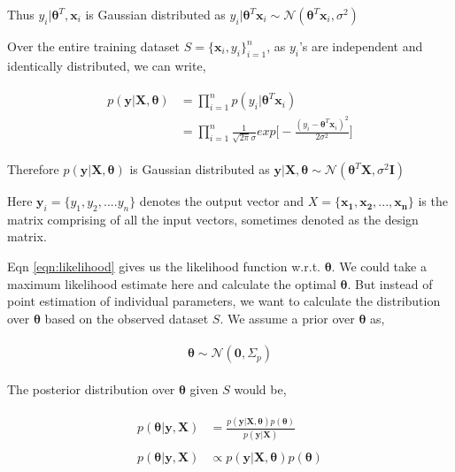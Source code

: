 \documentclass[english]{tktltiki}
\begin{document}
Thus $y_i|\boldsymbol\theta ^T, \mathbf{x}_i$ is Gaussian distributed as $y_i | \boldsymbol\theta ^T \mathbf{x}_i \sim \mathcal{N}(\boldsymbol\theta^T \mathbf{x}_i, \sigma^2)
$

Over the entire training dataset $S = \{\mathbf{x}_i, y_i\}_{i=1}^n$, as $y_i$'s are independent and identically distributed, we can write,

\begin{eqnarray}
\label{eqn:likelihood}
\begin{split}
	p(\mathbf{y} | \mathbf{X}, \boldsymbol\theta) &= \prod_{i = 1}^n p(y_i | \boldsymbol\theta ^T \mathbf{x}_i) \\
	&= \prod_{i = 1}^n \frac{1}{\sqrt{2 \pi} \sigma} exp \Big[-\frac{(y_i - \boldsymbol\theta ^T \mathbf{x}_i)^2}{2 \sigma^2} \Big]
\end{split}
\end{eqnarray}

Therefore $p(\mathbf{y} | \mathbf{X}, \boldsymbol\theta)$ is Gaussian distributed as $\mathbf{y} | \mathbf{X}, \boldsymbol\theta \sim \mathcal{N}(\boldsymbol\theta^T \mathbf{X}, \sigma^2 \mathbf{I})$

Here $\mathbf{y}_i = \{y_1, y_2, .... y_n\}$ denotes the output vector and $X = \{\mathbf{x_1}, \mathbf{x_2}, ..., \mathbf{x_n}\}$ is the matrix comprising of all the input vectors, sometimes denoted as the design matrix.



Eqn \ref{eqn:likelihood} gives us the likelihood function w.r.t. $\boldsymbol \theta$. We could take a maximum likelihood estimate here and calculate the optimal $\boldsymbol \theta$. But instead of point estimation of individual parameters, we want to calculate the distribution over $\boldsymbol \theta$ based on the observed dataset $S$. We assume a prior over $\boldsymbol \theta$ as,

\begin{eqnarray}
\label{eqn:prior}
\begin{split}
	\boldsymbol \theta \sim \mathcal{N}(\mathbf{0}, \Sigma_p)
\end{split}
\end{eqnarray}

The posterior distribution over $\boldsymbol \theta$ given $S$ would be,

\begin{eqnarray}
\begin{split}
p(\boldsymbol \theta | \mathbf{y}, \mathbf{X}) &= \frac{p(\mathbf{y} | \mathbf{X}, \boldsymbol\theta) p(\boldsymbol \theta)}{p(\mathbf{y} | \mathbf{X})} \\
&~\\
p(\boldsymbol \theta | \mathbf{y}, \mathbf{X}) & \propto p(\mathbf{y} | \mathbf{X}, \boldsymbol\theta) p(\boldsymbol \theta)
\end{split}
\end{eqnarray}
\end{document}
